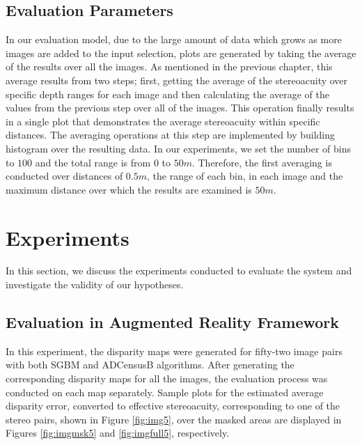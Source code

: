 \subsection{Evaluation Parameters}
In our evaluation model, due to the large amount of data which grows as more images are added to the input selection, 
plots are generated by taking the average of the results over all the images. As mentioned in the previous chapter, this average results from two steps; 
first, getting the average of the stereoacuity over specific
depth ranges for each image and then calculating the average of the values from the previous step over all of the images. This operation finally results in a single plot
that demonstrates the average stereoacuity within specific distances.
The averaging operations at this step are implemented by building histogram over the resulting data. 
In our experiments, we set the number of bins to $100$ and the total range is from $0$ to $50m$. Therefore, the first averaging is conducted over distances of $0.5m$, the range
of each bin, in each image and the maximum distance over which the results are 
examined is $50m$.


\section{Experiments}
In this section, we discuss the experiments conducted to evaluate the system and investigate the validity of our hypotheses.

\subsection{Evaluation in Augmented Reality Framework}

In this experiment, the disparity maps 
were generated for fifty-two image pairs with both SGBM and ADCensusB algorithms. 
After generating the corresponding disparity maps for all the images, 
the evaluation process was conducted on each map separately.\newline
Sample plots for the estimated average disparity error, converted to effective stereoacuity, corresponding to one of the stereo pairs, shown in Figure \ref{fig:img5},
over the masked areas are displayed in Figures \ref{fig:imgmsk5} and \ref{fig:imgfull5}, respectively.

